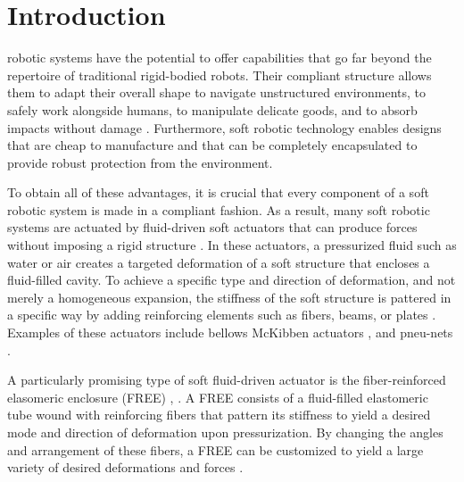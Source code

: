 \section{Introduction}
\label{sec:introduction}

 robotic systems have the potential to offer capabilities that go far beyond the repertoire of traditional rigid-bodied robots.
Their compliant structure allows them to adapt their overall shape to navigate unstructured environments, to safely work alongside humans, to manipulate delicate goods, and to absorb impacts without damage \cite{majidi2014soft}. 
Furthermore, soft robotic technology enables designs that are cheap to manufacture and that can be completely encapsulated to provide robust protection from the environment.


To obtain all of these advantages, it is crucial that every component of a soft robotic system is made in a compliant fashion.
As a result, many soft robotic systems are actuated by fluid-driven soft actuators that can produce forces without imposing a rigid structure \cite{grissom2006design, hawkes2017soft, marchese2014autonomous, tolley2014resilient}. 
In these actuators, a pressurized fluid such as water or air creates a targeted deformation of a soft structure that encloses a fluid-filled cavity. 
To achieve a specific type and direction of deformation, and not merely a homogeneous expansion, the stiffness of the soft structure is pattered in a specific way by adding reinforcing elements such as fibers, beams, or plates \cite{galloway2013mechanically, marchese2015recipe, rus2015design}. 
Examples of these actuators include bellows \cite{pridham1967bellows} McKibben actuators \cite{tondu2012modelling}, and pneu-nets \cite{mosadegh2014pneumatic}.


A particularly promising type of soft fluid-driven actuator is the fiber-reinforced elasomeric enclosure (FREE) \cite{bishop2015design, krishnan2012evaluating, bishop2013force}, .
A FREE consists of a fluid-filled elastomeric tube wound with reinforcing fibers that pattern its stiffness to yield a desired mode and direction of deformation upon pressurization. %
By changing the angles and arrangement of these fibers, a FREE can be customized to yield a large variety of desired deformations and forces \cite{bishop2015design}. 



